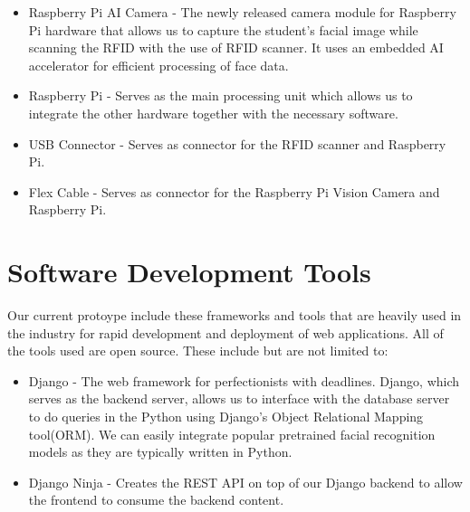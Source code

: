 \begin{itemize}
	\item	Raspberry Pi AI Camera - The newly released camera module for Raspberry Pi hardware that allows us to capture the student's facial image while scanning the RFID with the use of RFID scanner. It uses an embedded AI accelerator for efficient processing of face data.
	
\end{itemize} 

\begin{itemize}
	\item	Raspberry Pi - Serves as the main processing unit which allows us to integrate the other hardware together with the necessary software.
	
\end{itemize}

\begin{itemize}
	\item	USB Connector -  Serves as connector for the RFID scanner and Raspberry Pi.
	
\end{itemize}

\begin{itemize}
	\item	Flex Cable -  Serves as connector for the Raspberry Pi Vision Camera and Raspberry Pi. 
	
\end{itemize}

\section{Software Development Tools}
\label{sec:devtools}
Our current protoype include these frameworks and tools that are heavily used in the industry for rapid development and deployment of web applications. All of the tools used are open source. These include but are not limited to:

\begin{itemize}
	\item	Django - The web framework for perfectionists with deadlines. Django, which serves as the backend server, allows us to interface with the database server to do queries in the Python using Django's Object Relational Mapping tool(ORM). We can easily integrate popular pretrained facial recognition models as they are typically written in Python.
\end{itemize}

\begin{itemize}
	\item	Django Ninja - Creates the REST API on top of our Django backend to allow the frontend to consume the backend content.
\end{itemize}

